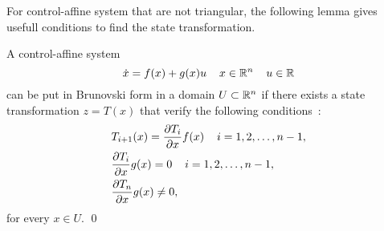  For control-affine system that are not triangular, the following lemma gives usefull conditions to find the state transformation.
\begin{lemme}{\blanc}
A control-affine system
$$
\dot x = f(x) + g(x)u \hh \hh x \in \real^n \hh \hh u \in \real
$$
can be put in Brunovski form in a domain $U \subset \mathbb{R}^n$ if there exists a state transformation $z = T(x)$ that verify the following conditions~:
\begin{equation*} \begin{split} 
& T_{i+1}(x) = \frac{\partial T_i}{\partial x}f(x) \hh \hh i=1,2, \ldots, n-1, \\
& \frac{\partial T_i}{\partial x}g(x) = 0 \hh \hh i=1,2, \ldots, n-1, \\
& \frac{\partial T_n}{\partial x}g(x) \neq 0,
\end{split} \end{equation*}
for every $x \in U$. \qed
\end{lemme}
\vv


